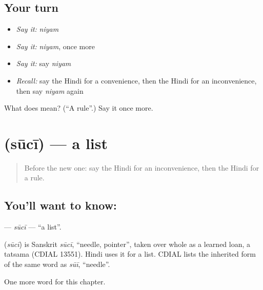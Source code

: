 \subsection*{Your turn}
\begin{itemize}
\raggedright
  \item \emph{Say it:} \emph{niyam}
  \item \emph{Say it:} \emph{niyam}, once more
  \item \emph{Say it:} say \emph{niyam}
  \item \emph{Recall:} say the Hindi for a convenience, then the Hindi for an inconvenience, then say \emph{niyam} again
\end{itemize}

\begin{tcolorbox}[breakable,colback=teal!4,colframe=teal!35!black,title={Before you move on}]
What does  mean? (\textquotedblleft{}A rule\textquotedblright{}.) Say it once more.
\end{tcolorbox}
\section[\texorpdfstring{\hi{सूची} (sūcī)}{सूची (sūcī)}]{ (sūcī) — a list}

\label{lesson:HI-C260-suci}



\begin{quote}
Before the new one: say the Hindi for an inconvenience, then the Hindi for a rule.
\end{quote}

\subsection*{You'll want to know: }
\textbf{} — \emph{sūcī} — \textquotedblleft{}a list\textquotedblright{}.

\begin{cousinweb}
\textbf{} (\emph{sūcī}) is Sanskrit \emph{sūcī}, \textquotedblleft{}needle, pointer\textquotedblright{}, taken over whole as a learned loan, a tatsama (CDIAL 13551). Hindi uses it for a list. CDIAL lists the inherited form of the same word as \emph{sūī}, \textquotedblleft{}needle\textquotedblright{}.
\end{cousinweb}

\begin{grammarlens}[title={What you've built}]
One more word for this chapter.
\end{grammarlens}

